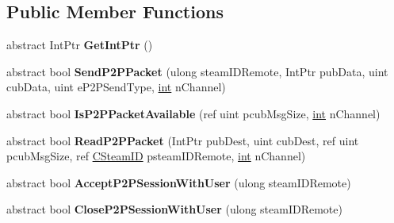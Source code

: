 \subsection*{Public Member Functions}
\begin{DoxyCompactItemize}
\item 
\hypertarget{classValve_1_1Steamworks_1_1ISteamNetworking_a3a4a43c494702182e2176cdaa1e7552f}{}abstract Int\+Ptr {\bfseries Get\+Int\+Ptr} ()\label{classValve_1_1Steamworks_1_1ISteamNetworking_a3a4a43c494702182e2176cdaa1e7552f}

\item 
\hypertarget{classValve_1_1Steamworks_1_1ISteamNetworking_ae87925e76d6f39b23a722ff476e29800}{}abstract bool {\bfseries Send\+P2\+P\+Packet} (ulong steam\+I\+D\+Remote, Int\+Ptr pub\+Data, uint cub\+Data, uint e\+P2\+P\+Send\+Type, \hyperlink{SDL__thread_8h_a6a64f9be4433e4de6e2f2f548cf3c08e}{int} n\+Channel)\label{classValve_1_1Steamworks_1_1ISteamNetworking_ae87925e76d6f39b23a722ff476e29800}

\item 
\hypertarget{classValve_1_1Steamworks_1_1ISteamNetworking_a9d7a294dcb7754ca0d44a715ccee36f7}{}abstract bool {\bfseries Is\+P2\+P\+Packet\+Available} (ref uint pcub\+Msg\+Size, \hyperlink{SDL__thread_8h_a6a64f9be4433e4de6e2f2f548cf3c08e}{int} n\+Channel)\label{classValve_1_1Steamworks_1_1ISteamNetworking_a9d7a294dcb7754ca0d44a715ccee36f7}

\item 
\hypertarget{classValve_1_1Steamworks_1_1ISteamNetworking_ac55ed4a4f96a23f5a9a01d31781614b7}{}abstract bool {\bfseries Read\+P2\+P\+Packet} (Int\+Ptr pub\+Dest, uint cub\+Dest, ref uint pcub\+Msg\+Size, ref \hyperlink{structValve_1_1Steamworks_1_1CSteamID}{C\+Steam\+I\+D} psteam\+I\+D\+Remote, \hyperlink{SDL__thread_8h_a6a64f9be4433e4de6e2f2f548cf3c08e}{int} n\+Channel)\label{classValve_1_1Steamworks_1_1ISteamNetworking_ac55ed4a4f96a23f5a9a01d31781614b7}

\item 
\hypertarget{classValve_1_1Steamworks_1_1ISteamNetworking_a64aeaddce0b3a7957cf90a54d1e95f25}{}abstract bool {\bfseries Accept\+P2\+P\+Session\+With\+User} (ulong steam\+I\+D\+Remote)\label{classValve_1_1Steamworks_1_1ISteamNetworking_a64aeaddce0b3a7957cf90a54d1e95f25}

\item 
\hypertarget{classValve_1_1Steamworks_1_1ISteamNetworking_a7960ee3d85348e4b49fb98447aef7762}{}abstract bool {\bfseries Close\+P2\+P\+Session\+With\+User} (ulong steam\+I\+D\+Remote)\label{classValve_1_1Steamworks_1_1ISteamNetworking_a7960ee3d85348e4b49fb98447aef7762}


\end{DoxyCompactItemize}
